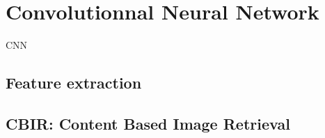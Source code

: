 \section{Convolutionnal Neural Network}
\gls{CNN}

\subsection{Feature extraction}

\subsection{CBIR: Content Based Image Retrieval}

